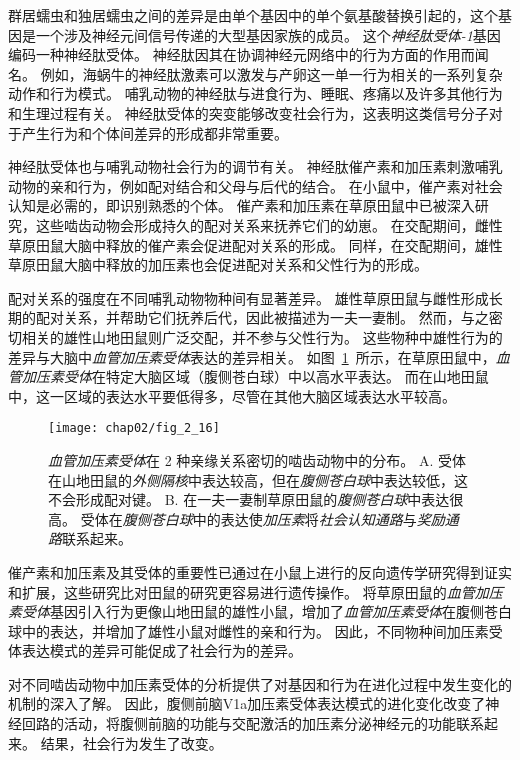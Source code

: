群居蠕虫和独居蠕虫之间的差异是由单个基因中的单个氨基酸替换引起的，这个基因是一个涉及神经元间信号传递的大型基因家族的成员。
这个\textit{神经肽受体-1}基因编码一种神经肽受体。
神经肽因其在协调神经元网络中的行为方面的作用而闻名。
例如，海蜗牛的神经肽激素可以激发与产卵这一单一行为相关的一系列复杂动作和行为模式。
哺乳动物的神经肽与进食行为、睡眠、疼痛以及许多其他行为和生理过程有关。
神经肽受体的突变能够改变社会行为，这表明这类信号分子对于产生行为和个体间差异的形成都非常重要。


神经肽受体也与哺乳动物社会行为的调节有关。
神经肽催产素和加压素刺激哺乳动物的亲和行为，例如配对结合和父母与后代的结合。
在小鼠中，催产素对社会认知是必需的，即识别熟悉的个体。
催产素和加压素在草原田鼠中已被深入研究，这些啮齿动物会形成持久的配对关系来抚养它们的幼崽。
在交配期间，雌性草原田鼠大脑中释放的催产素会促进配对关系的形成。
同样，在交配期间，雄性草原田鼠大脑中释放的加压素也会促进配对关系和父性行为的形成。



配对关系的强度在不同哺乳动物物种间有显著差异。
雄性草原田鼠与雌性形成长期的配对关系，并帮助它们抚养后代，因此被描述为一夫一妻制。
然而，与之密切相关的雄性山地田鼠则广泛交配，并不参与父性行为。
这些物种中雄性行为的差异与大脑中\textit{血管加压素受体}表达的差异相关。
如图~\ref{fig:2_16}~所示，在草原田鼠中，\textit{血管加压素受体}在特定大脑区域（腹侧苍白球）中以高水平表达。 
而在山地田鼠中，这一区域的表达水平要低得多，尽管在其他大脑区域表达水平较高。


\begin{figure}[htbp]
	\centering
	\texttt{[image: chap02/fig\_2\_16]}
	\caption{\textit{血管加压素受体}在 2 种亲缘关系密切的啮齿动物中的分布\cite{young2001cellular}。
		A. 受体在山地田鼠的\textit{外侧隔核}中表达较高，但在\textit{腹侧苍白球}中表达较低，这不会形成配对键。
		B. 在一夫一妻制草原田鼠的\textit{腹侧苍白球}中表达很高。
		受体在\textit{腹侧苍白球}中的表达使\textit{加压素}将\textit{社会认知通路}与\textit{奖励通路}联系起来。}
	\label{fig:2_16}
\end{figure}


催产素和加压素及其受体的重要性已通过在小鼠上进行的反向遗传学研究得到证实和扩展，这些研究比对田鼠的研究更容易进行遗传操作。
将草原田鼠的\textit{血管加压素受体}基因引入行为更像山地田鼠的雄性小鼠，增加了\textit{血管加压素受体}在腹侧苍白球中的表达，并增加了雄性小鼠对雌性的亲和行为。
因此，不同物种间加压素受体表达模式的差异可能促成了社会行为的差异。





对不同啮齿动物中加压素受体的分析提供了对基因和行为在进化过程中发生变化的机制的深入了解。
因此，腹侧前脑V1a加压素受体表达模式的进化变化改变了神经回路的活动，将腹侧前脑的功能与交配激活的加压素分泌神经元的功能联系起来。
结果，社会行为发生了改变。

